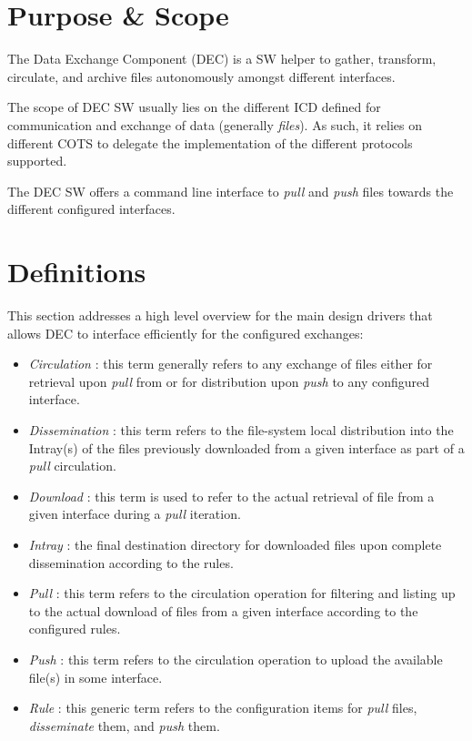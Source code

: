 \documentclass[dec_sum_main.tex]{subfiles}
\begin{document}
\section{Purpose \& Scope}
The Data Exchange Component (DEC) is a SW helper to gather, transform, circulate, and archive files autonomously amongst different interfaces. \newline
\par
\noindent
The scope of DEC SW usually lies on the different ICD defined for communication and exchange of data (generally \textit{files}). As such, it relies on different COTS to delegate the implementation of the different protocols supported.\newline
\par
\noindent
The DEC SW offers a command line interface to \textit{pull} and \textit{push} files towards the different configured interfaces.

\section{Definitions}
This section addresses a high level overview for the main design drivers that allows DEC to interface efficiently for the configured exchanges:

\begin{itemize}
	\item \textit{Circulation} : this term generally refers to any exchange of files either for retrieval upon \textit{pull} from or for distribution upon \textit{push} to any configured interface.
	\item \textit{Dissemination} : this term refers to the file-system local distribution into the Intray(s) of the files previously downloaded from a given interface as part of a \textit{pull} circulation.
	\item \textit{Download} : this term is used to refer to the actual retrieval of file from a given interface during a \textit{pull} iteration.
	\item \textit{Intray} : the final destination directory for downloaded files upon complete dissemination according to the rules.
	\item \textit{Pull} : this term refers to the circulation operation for filtering and listing up to the actual download of files from a given interface according to the configured rules. 
	\item \textit{Push} : this term refers to the circulation operation to upload the available file(s) in some interface. 
	\item \textit{Rule} : this generic term refers to the configuration items for \textit{pull} files, \textit{disseminate} them, and \textit{push} them.
\end{itemize}
\end{document}
